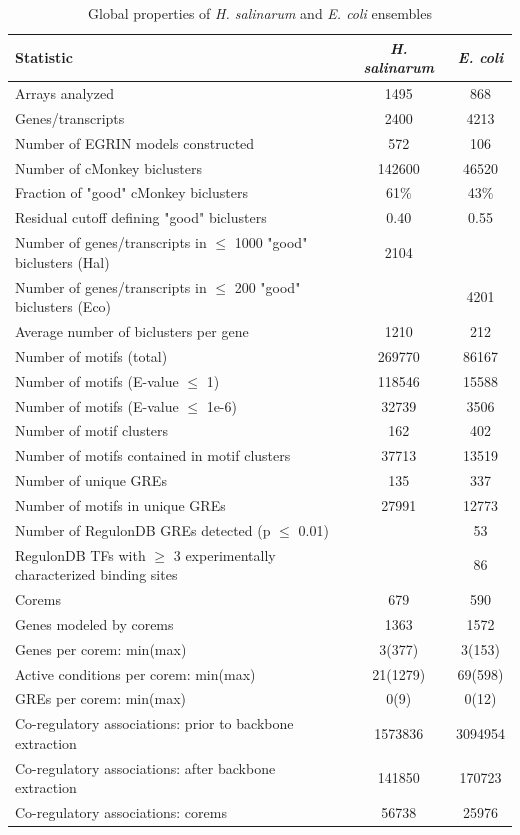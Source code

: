 \begin{table}[htbp]
  \raggedright
    \begin{tabular}{|l|c|c|}
    \hline
    \textbf{Statistic} & \textit{\textbf{H. salinarum}} & \textit{\textbf{E. coli}} \\
    \hline
    Arrays analyzed & 1495  & 868 \\
    Genes/transcripts & 2400  & 4213 \\
    Number of EGRIN models constructed & 572   & 106 \\
    Number of cMonkey biclusters & 142600 & 46520 \\
    Fraction of "good" cMonkey biclusters & 61\%  & 43\% \\
    Residual cutoff defining "good" biclusters & 0.40  & 0.55 \\
    Number of genes/transcripts in $\leq$ 1000 "good" biclusters (Hal) & 2104  &  \\
    Number of genes/transcripts in $\leq$ 200 "good" biclusters (Eco) &       & 4201 \\
    Average number of biclusters per gene & 1210  & 212 \\
    Number of motifs (total) & 269770 & 86167 \\
    Number of motifs (E-value $\leq$ 1) & 118546 & 15588 \\
    Number of motifs  (E-value $\leq$ 1e-6) & 32739 & 3506 \\
    Number of motif clusters & 162   & 402 \\
    Number of motifs contained in motif clusters & 37713 & 13519 \\
    Number of unique GREs & 135   & 337 \\
    Number of motifs in unique GREs & 27991 & 12773 \\
    Number of RegulonDB GREs detected (p $\leq$ 0.01) &       & 53 \\
    RegulonDB TFs with $\geq$ 3 experimentally characterized binding sites &       & 86 \\
    Corems & 679   & 590 \\
    Genes modeled by corems & 1363  & 1572 \\
    Genes per corem: min(max) & 3(377) & 3(153) \\
    Active conditions per corem: min(max) & 21(1279) & 69(598) \\
    GREs per corem: min(max) & 0(9)  & 0(12) \\
    Co-regulatory associations: prior to backbone extraction & 1573836 & 3094954 \\
    Co-regulatory associations: after backbone extraction & 141850 & 170723 \\
    Co-regulatory associations: corems & 56738 & 25976 \\
    \hline
    \end{tabular}%
    \caption{ Global properties of \textit{H. salinarum} and \textit{E. coli} ensembles}
  \label{tab:stats}%
\end{table}%

